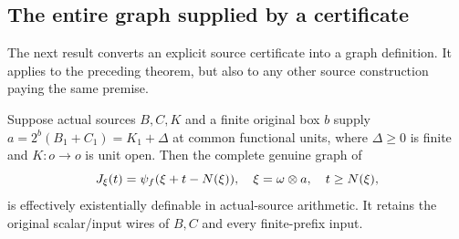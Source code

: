 \subsection{The entire graph supplied by a certificate}\label{sec:head-graph}

The next result converts an explicit source certificate into a graph definition.  It applies to
the preceding theorem, but also to any other source construction paying
the same premise.

\begin{theorem}\label{thm:head-graph}
Suppose actual sources $B,C,K$ and a finite original box $b$ supply
$a=2^b(B_1+C_1)=K_1+\Delta$ at common functional units, where
$\Delta\ge0$ is finite and $K:o\to o$ is unit open.  Then the complete
genuine graph of
\[
 J_\xi(t)=\psi_f(\xi+t-N(\xi)),\quad
 \xi=\omega\otimes a,\quad t\ge N(\xi),
\]
is effectively existentially definable in actual-source arithmetic.  It
retains the original scalar/input wires of $B,C$ and every finite-prefix input.
\end{theorem}
